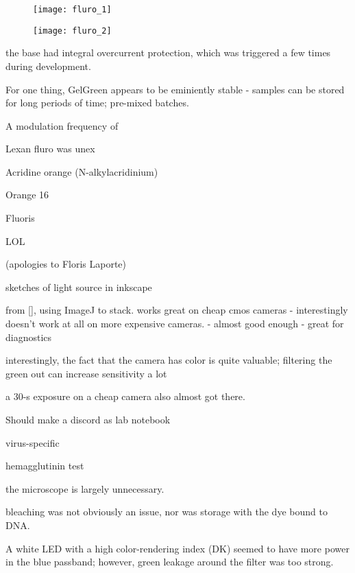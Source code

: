 \documentclass[paper.tex]{subfiles}
\begin{document}
\begin{figure}[H]
	\captionsetup{singlelinecheck = false, justification=justified}
	\centering
	\texttt{[image: fluro\_1]}
	\caption{}
\end{figure}

\begin{figure}[H]
	\captionsetup{singlelinecheck = false, justification=justified}
	\centering
	\texttt{[image: fluro\_2]}
	\caption{}
\end{figure}

the base had integral overcurrent protection, which was triggered a few times during development.

For one thing, GelGreen appears to be eminiently stable - samples can be stored for long periods of time; pre-mixed batches.


A modulation frequency of 

Lexan fluro was unex

Acridine orange (N-alkylacridinium)

Orange 16 

Fluoris
 
 LOL
 
(apologies to Floris Laporte)

sketches of light source in inkscape

from [], using ImageJ to stack. works great on cheap cmos cameras - interestingly doesn't work at all on more expensive cameras. - 
almost good enough - great for diagnostics

interestingly, the fact that the camera has color is quite valuable; filtering the green out can increase sensitivity a lot

a 30-s exposure on a cheap camera also almost got there.

Should make a discord as lab notebook


virus-specific

hemagglutinin test

the microscope is largely unnecessary. 


bleaching was not obviously an issue, nor was storage with the dye bound to DNA.


A white LED with a high color-rendering index (DK) seemed to have more power in the blue passband; however, green leakage around the filter was too strong. 
\end{document}
